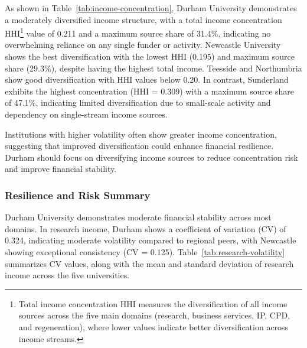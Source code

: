 \documentclass[journal,onecolumn, 10pt,draftclsnofoot]{IEEEtran}
\begin{document}
As shown in Table~\ref{tab:income-concentration}, Durham University demonstrates a moderately diversified income structure, with a total income concentration HHI\footnote{Total income concentration HHI measures the diversification of all income sources across the five main domains (research, business services, IP, CPD, and regeneration), where lower values indicate better diversification across income streams.} value of 0.211 and a maximum source share of 31.4\%, indicating no overwhelming reliance on any single funder or activity. Newcastle University shows the best diversification with the lowest HHI (0.195) and maximum source share (29.3\%), despite having the highest total income. Teesside and Northumbria show good diversification with HHI values below 0.20. In contrast, Sunderland exhibits the highest concentration (HHI = 0.309) with a maximum source share of 47.1\%, indicating limited diversification due to small-scale activity and dependency on single-stream income sources.

Institutions with higher volatility often show greater income concentration, suggesting that improved diversification could enhance financial resilience. Durham should focus on diversifying income sources to reduce concentration risk and improve financial stability.

\subsubsection{Resilience and Risk Summary}

Durham University demonstrates moderate financial stability across most domains. In research income, Durham shows a coefficient of variation (CV) of 0.324, indicating moderate volatility compared to regional peers, with Newcastle showing exceptional consistency (CV = 0.125). Table~\ref{tab:research-volatility} summarizes CV values, along with the mean and standard deviation of research income across the five universities.
\vspace{0.25cm}
\begin{table}[h]
\centering
\caption{Research Income Volatility Analysis - North East Universities}
\vspace{0.1cm}
\label{tab:research-volatility}
\end{table}
\end{document}
